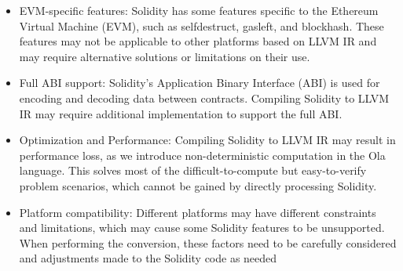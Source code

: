 \begin{itemize}
    \item EVM-specific features: Solidity has some features specific to the Ethereum Virtual Machine (EVM), such as selfdestruct, gasleft, and blockhash. These features may not be applicable to other platforms based on LLVM IR and may require alternative solutions or limitations on their use.

    \item Full ABI support: Solidity's Application Binary Interface (ABI) is used for encoding and decoding data between contracts. Compiling Solidity to LLVM IR may require additional implementation to support the full ABI.

    \item Optimization and Performance: Compiling Solidity to LLVM IR may result in performance loss, as we introduce non-deterministic computation in the Ola language. This solves most of the difficult-to-compute but easy-to-verify problem scenarios, which cannot be gained by directly processing Solidity.

    \item Platform compatibility: Different platforms may have different constraints and limitations, which may cause some Solidity features to be unsupported. When performing the conversion, these factors need to be carefully considered and adjustments made to the Solidity code as needed
\end{itemize}
